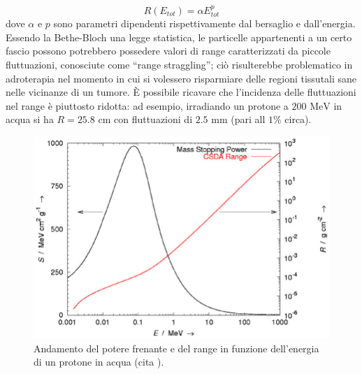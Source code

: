 \documentclass[12pt,a4paper,twoside]{report}
\begin{document}
	\begin{equation}
		R(E_{tot})=\alpha E_{tot}^p
		\label{eq:range_approx}
	\end{equation}
	dove $\alpha$ e $p$ sono parametri dipendenti rispettivamente dal bersaglio e dall'energia. Essendo la Bethe-Bloch una legge statistica, le particelle appartenenti a un certo fascio possono potrebbero possedere valori di range caratterizzati da piccole fluttuazioni, conosciute come ``range straggling''; ciò risulterebbe problematico in adroterapia nel momento in cui si volessero risparmiare delle regioni tissutali sane nelle vicinanze di un tumore. \`E possibile ricavare che l'incidenza delle fluttuazioni nel range è piuttosto ridotta: ad esempio, irradiando un protone a $200\mbox{ MeV}$ in acqua si ha $R=25.8\mbox{ cm}$ con fluttuazioni di $2.5\mbox{ mm}$ (pari all $1\%$ circa).
	\begin{figure}[H]
		\centering
		\includegraphics[width=0.9\linewidth]{adroterapic_range.png}
		\caption{Andamento del potere frenante e del range in funzione dell'energia di un protone in acqua (cita
			).}
		\label{fig:adroterapic_range}
	\end{figure}
	
\end{document}
